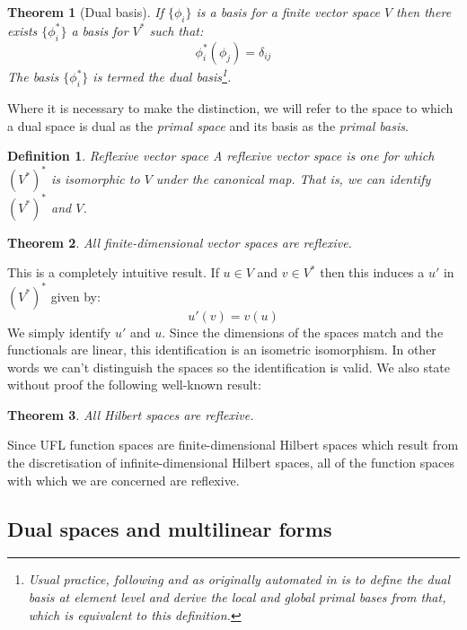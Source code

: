 \documentclass[a4paper,11pt]{article}
\newtheorem{theorem}{Theorem}[section]
\newtheorem{definition}{Definition}[section]
\begin{document}
\begin{theorem}[Dual basis]
If $\{\phi_i\}$ is a basis for a finite vector space $V$ then there exists $\{\phi_i^*\}$ a basis for $V^*$ such that:
\begin{equation} 
    \phi_i^*(\phi_j) = \delta_{ij}
\end{equation} 
The basis $\{\phi_i^*\}$ is termed the \emph{dual basis}\footnote{Usual practice, following \parencite{Ciarlet2002} and as originally automated in \parencite{kirby2004} is to define the dual basis at element level and derive the local and global primal bases from that, which is equivalent to this definition.}.
\end{theorem}
Where it is necessary to make the distinction, we will refer to the space to which a dual space is dual as the \emph{primal space} and its basis as the \emph{primal basis}.
\begin{definition}{Reflexive vector space}
    A reflexive vector space is one for which $(V^{*})^{*}$ is isomorphic to $V$ under the canonical map. That is, we can identify $(V^*)^*$ and $V$.
\end{definition}
\begin{theorem}
    All finite-dimensional vector spaces are reflexive.
\end{theorem}
This is a completely intuitive result. If $u\in V$ and $v\in V^*$ then this induces a $u'$ in $(V^*)^*$ given by:
\begin{equation}
    u'(v) = v(u)    
\end{equation}
We simply identify $u'$ and $u$. Since the dimensions of the spaces match and the functionals are linear, this identification is an isometric isomorphism. In other words we can't distinguish the spaces so the identification is valid. We also state without proof the following well-known result:

\begin{theorem}
    All Hilbert spaces are reflexive.
\end{theorem}

Since UFL function spaces are finite-dimensional Hilbert spaces which result from the discretisation of infinite-dimensional Hilbert spaces, all of the function spaces with which we are concerned are reflexive.

\subsection{Dual spaces and multilinear forms}
\end{document}
